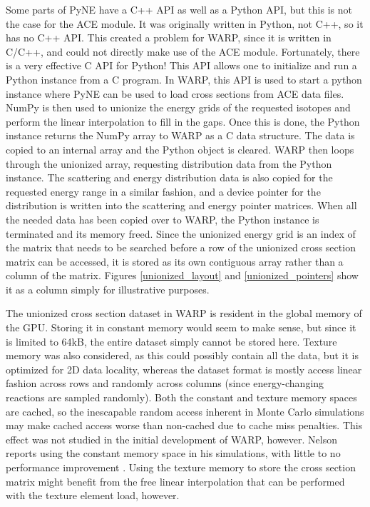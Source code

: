 Some parts of PyNE have a C++ API as well as a Python API, but this is not the case for the ACE module.  It was originally written in Python, not C++, so it has no C++ API.  This created a problem for WARP, since it is written in C/C++, and could not directly make use of the ACE module.  Fortunately, there is a very effective C API for Python!  This API allows one to initialize and run a Python instance from a C program.  In WARP, this API is used to start a python instance where PyNE can be used to load cross sections from ACE data files.  NumPy is then used to unionize the energy grids of the requested isotopes and perform the linear interpolation to fill in the gaps.  Once this is done, the Python instance returns the NumPy array to WARP as a C data structure.  The data is copied to an internal array and the Python object is cleared.  WARP then loops through the unionized array, requesting distribution data from the Python instance.  The scattering and energy distribution data is also copied for the requested energy range in a similar fashion, and a device pointer for the distribution is written into the scattering and energy pointer matrices.  When all the needed data has been copied over to WARP, the Python instance is terminated and its memory freed.  Since the unionized energy grid is an index of the matrix that needs to be searched before a row of the unionized cross section matrix can be accessed, it is stored as its own contiguous array rather than a column of the matrix.  Figures \ref{unionized_layout} and \ref{unionized_pointers} show it as a column simply for illustrative purposes.

The unionized cross section dataset in WARP is resident in the global memory of the GPU.  Storing it in constant memory would seem to make sense, but since it is limited to 64kB, the entire dataset simply cannot be stored here.  Texture memory was also considered, as this could possibly contain all the data, but it is optimized for 2D data locality, whereas the dataset format is mostly access linear fashion across rows and randomly across columns (since energy-changing reactions are sampled randomly).  Both the constant and texture memory spaces are cached, so the inescapable  random access inherent in Monte Carlo simulations may make cached access worse than non-cached due to cache miss penalties.  This effect was not studied in the initial development of WARP, however.  Nelson reports using the constant memory space in his simulations, with little to no performance improvement \cite{nelson}.  Using the texture memory to store the cross section matrix might benefit from the free linear interpolation that can be performed with the texture element load, however.

